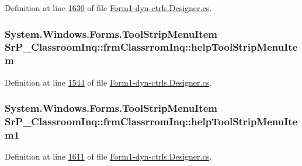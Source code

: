 \-Definition at line \hyperlink{_form1-dyn-ctrls_8_designer_8cs_source_l01630}{1630} of file \hyperlink{_form1-dyn-ctrls_8_designer_8cs_source}{\-Form1-\/dyn-\/ctrls.\-Designer.\-cs}.

\hypertarget{class_sr_p___classroom_inq_1_1frm_classrrom_inq_a2cf34a0cb0b52c60e6faea821b2ce0a9}{
\subsubsection[{help\-Tool\-Strip\-Menu\-Item}]{\setlength{\rightskip}{0pt plus 5cm}\-System.\-Windows.\-Forms.\-Tool\-Strip\-Menu\-Item {\bf \-Sr\-P\-\_\-\-Classroom\-Inq\-::frm\-Classrrom\-Inq\-::help\-Tool\-Strip\-Menu\-Item}}}
\label{class_sr_p___classroom_inq_1_1frm_classrrom_inq_a2cf34a0cb0b52c60e6faea821b2ce0a9}


\-Definition at line \hyperlink{_form1-dyn-ctrls_8_designer_8cs_source_l01544}{1544} of file \hyperlink{_form1-dyn-ctrls_8_designer_8cs_source}{\-Form1-\/dyn-\/ctrls.\-Designer.\-cs}.

\hypertarget{class_sr_p___classroom_inq_1_1frm_classrrom_inq_a09bf82e0de8e7288e39988c7bfc5f5e7}{
\subsubsection[{help\-Tool\-Strip\-Menu\-Item1}]{\setlength{\rightskip}{0pt plus 5cm}\-System.\-Windows.\-Forms.\-Tool\-Strip\-Menu\-Item {\bf \-Sr\-P\-\_\-\-Classroom\-Inq\-::frm\-Classrrom\-Inq\-::help\-Tool\-Strip\-Menu\-Item1}}}
\label{class_sr_p___classroom_inq_1_1frm_classrrom_inq_a09bf82e0de8e7288e39988c7bfc5f5e7}


\-Definition at line \hyperlink{_form1-dyn-ctrls_8_designer_8cs_source_l01611}{1611} of file \hyperlink{_form1-dyn-ctrls_8_designer_8cs_source}{\-Form1-\/dyn-\/ctrls.\-Designer.\-cs}.

